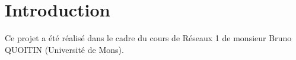 \section{Introduction}
Ce projet a été réalisé dans le cadre du cours de Réseaux 1 de monsieur Bruno QUOITIN (Université de Mons).
